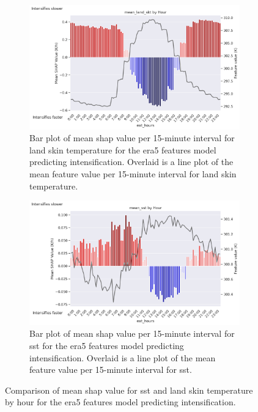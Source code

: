 \begin{figure}[ht]
    \centering
    \begin{subfigure}[t]{\textwidth}
        \centering
        \includegraphics[width=\textwidth]{../figures/generated/experiments/obs_intensification/temporal_corr/obs_intensification_era5_shap_mean_land_skt_by_hour.png}
        \caption{Bar plot of mean \acrshort{shap} value per 15-minute interval for land skin temperature for the \acrshort{era5} features model predicting intensification. Overlaid is a line plot of the mean feature value per 15-minute interval for land skin temperature.}
        \label{fig:obs_intensification_era5_shap_mean_land_skt_by_hour}
    \end{subfigure}
    \vspace{1em}
    \begin{subfigure}[t]{\textwidth}
        \centering
        \includegraphics[width=\textwidth]{../figures/generated/experiments/obs_intensification/temporal_corr/obs_intensification_era5_shap_mean_sst_by_hour.png}
        \caption{Bar plot of mean \acrshort{shap} value per 15-minute interval for \acrlong{sst} for the \acrshort{era5} features model predicting intensification. Overlaid is a line plot of the mean feature value per 15-minute interval for \acrlong{sst}.}
        \label{fig:obs_intensification_era5_shap_mean_sst_by_hour}
    \end{subfigure}
    \caption{Comparison of mean \acrshort{shap} value for \acrlong{sst} and land skin temperature by hour for the \acrshort{era5} features model predicting intensification.}
    \label{fig:obs_intensification_sst_skt_by_hour}
\end{figure}

